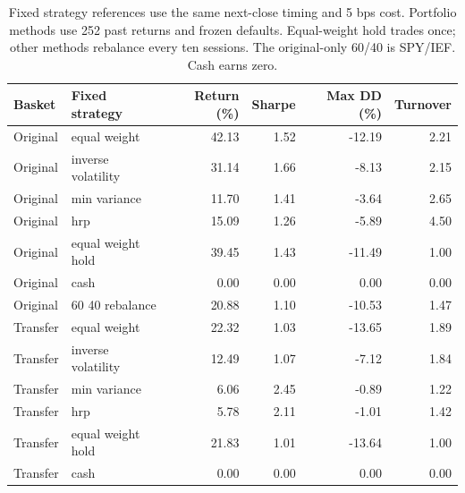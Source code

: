 \begin{table}[t]
\centering\small
\setlength{\tabcolsep}{4pt}
\begin{tabular}{llrrrr}
\toprule
Basket & Fixed strategy & Return (\%) & Sharpe & Max DD (\%) & Turnover \\
\midrule
Original & equal weight & 42.13 & 1.52 & -12.19 & 2.21 \\
Original & inverse volatility & 31.14 & 1.66 & -8.13 & 2.15 \\
Original & min variance & 11.70 & 1.41 & -3.64 & 2.65 \\
Original & hrp & 15.09 & 1.26 & -5.89 & 4.50 \\
Original & equal weight hold & 39.45 & 1.43 & -11.49 & 1.00 \\
Original & cash & 0.00 & 0.00 & 0.00 & 0.00 \\
Original & 60 40 rebalance & 20.88 & 1.10 & -10.53 & 1.47 \\
Transfer & equal weight & 22.32 & 1.03 & -13.65 & 1.89 \\
Transfer & inverse volatility & 12.49 & 1.07 & -7.12 & 1.84 \\
Transfer & min variance & 6.06 & 2.45 & -0.89 & 1.22 \\
Transfer & hrp & 5.78 & 2.11 & -1.01 & 1.42 \\
Transfer & equal weight hold & 21.83 & 1.01 & -13.64 & 1.00 \\
Transfer & cash & 0.00 & 0.00 & 0.00 & 0.00 \\
\bottomrule
\end{tabular}
\caption{Fixed strategy references use the same next-close timing and 5 bps cost. Portfolio methods use 252 past returns and frozen defaults. Equal-weight hold trades once; other methods rebalance every ten sessions. The original-only 60/40 is SPY/IEF. Cash earns zero.}
\label{tab:factorial-baselines}
\end{table}
